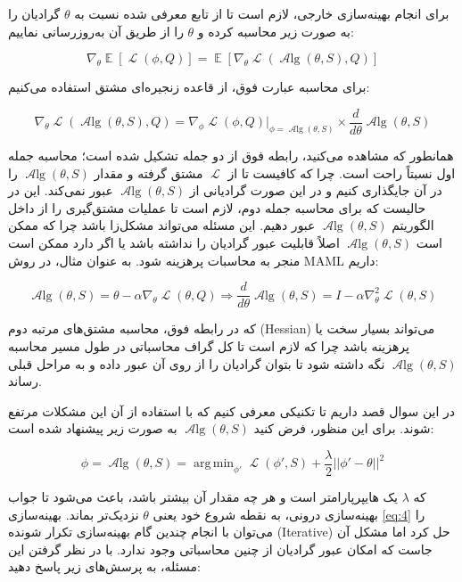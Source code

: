 \documentclass{article}
\DeclareMathOperator*{\argmin}{arg\,min}
\DeclareMathOperator{\Loss}{\mathcal{L}}
\DeclareMathOperator{\Alg}{\mathcal{A}lg}
\DeclareMathOperator{\E}{\mathbb{E}}
\begin{document}
برای انجام بهینه‌سازی خارجی، لازم است تا از تابع معرفی شده نسبت به 
$\theta$
گرادیان را به صورت زیر محاسبه کرده و $\theta$ را از طریق آن به‌روزرسانی نماییم:

\begin{equation} \label{eq:1}
		\nabla_{\theta} \E [\Loss (\phi, Q)] = 
		\E [\nabla_{\theta} \Loss (\Alg(\theta, S), Q)]
\end{equation}

برای محاسبه عبارت فوق، از قاعده زنجیره‌ای مشتق استفاده می‌کنیم:

\begin{equation}		\label{eq:2}
		\nabla_{\theta} \Loss (\Alg(\theta, S), Q) 		= \nabla_{\phi} \Loss (\phi, Q) |_{\phi = \Alg(\theta, S)} 
		\times \frac{d}{d\theta}\Alg(\theta, S)
\end{equation}

همانطور که مشاهده می‌کنید، رابطه فوق از دو جمله تشکیل شده است؛ محاسبه جمله اول نسبتاً راحت است. چرا که کافیست تا از 
$\Loss$
مشتق گرفته و مقدار 
$\Alg(\theta, S)$
را در آن جایگذاری کنیم و در این صورت گرادیانی از 
$\Alg(\theta, S)$
عبور نمی‌کند. این در حالیست که برای محاسبه جمله دوم، لازم است تا عملیات مشتق‌گیری را از داخل الگوریتم $\Alg(\theta, S)$ عبور دهیم. این مسئله می‌تواند مشکل‌زا باشد چرا که ممکن است $\Alg(\theta, S)$ اصلاً قابلیت عبور گرادیان را نداشته باشد یا اگر دارد ممکن است منجر به محاسبات پرهزینه شود. به عنوان مثال، در روش MAML داریم:

\begin{equation}		\label{eq:3}
	\Alg(\theta,S) = \theta - \alpha \nabla_\theta \Loss (\theta, Q) \Rightarrow \frac{d}{d\theta}\Alg(\theta, S) = I - \alpha \nabla^2_\theta \Loss (\theta, S)
\end{equation}
 
 که در رابطه فوق، محاسبه مشتق‌های مرتبه دوم (Hessian) می‌تواند بسیار سخت یا پرهزینه باشد چرا که لازم است تا کل گراف محاسباتی در طول مسیر محاسبه
 $\Alg(\theta, S)$
  نگه داشته شود تا بتوان گرادیان را از روی آن عبور داده و به مراحل قبلی رساند.
  
در این سوال قصد داریم تا تکنیکی معرفی کنیم که با استفاده از آن این مشکلات مرتفع شوند. برای این منظور، فرض کنید 
$\Alg(\theta, S)$
به صورت زیر پیشنهاد شده است:

\begin{equation}		\label{eq:4}
	\phi = \Alg(\theta,S) = \argmin_{\phi'} \Loss(\phi', S) + \frac{\lambda}{2}||\phi' - \theta||^2
\end{equation}
 
که $\lambda$ یک هایپرپارامتر است و هر چه مقدار آن بیشتر باشد، باعث می‌شود تا جواب بهینه‌سازی درونی، به نقطه شروع خود یعنی
$\theta$
نزدیک‌تر بماند. بهینه‌سازی \ref{eq:4}
را می‌توان با انجام چندین گام بهینه‌سازی تکرار شونده (Iterative) حل کرد اما مشکل آن جاست که امکان عبور گرادیان از چنین محاسباتی وجود ندارد. با در نظر گرفتن این مسئله، به پرسش‌های زیر پاسخ دهید:
\end{document}
